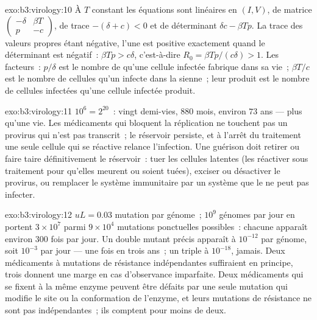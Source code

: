 \begin{solution}{exo:b3:virology:10}
À $T$ constant les équations sont linéaires en $(I, V)$, de matrice
$\begin{pmatrix} -\delta & \beta T \\ p & -c \end{pmatrix}$, de trace
$-(\delta + c) < 0$ et de déterminant $\delta c - \beta Tp$. La trace
des valeurs propres étant négative, l'une est positive exactement quand
le déterminant est négatif~: $\beta Tp > c\delta$, c'est-à-dire
$R_{0} = \beta
Tp/(c\delta) > 1$. Les facteurs~: $p/\delta$ est le nombre de 
qu'une cellule infectée fabrique dans sa vie~; $\beta T/c$ est le
nombre de cellules qu'un  infecte dans la sienne~; leur produit
est le nombre de cellules infectées qu'une cellule infectée produit.
\end{solution}

\begin{solution}{exo:b3:virology:11}
$10^{6} = 2^{20}$~: vingt demi-vies, $880$ mois, environ $73$ ans ---
plus qu'une vie. Les médicaments qui bloquent la réplication ne
touchent pas un provirus qui n'est pas transcrit~; le réservoir
persiste, et à l'arrêt du traitement une seule cellule qui se réactive
relance l'infection. Une guérison doit retirer ou faire taire
définitivement le réservoir~: tuer les cellules latentes (les réactiver
sous traitement pour qu'elles meurent ou soient tuées), exciser ou
désactiver le provirus, ou remplacer le système immunitaire par un
système que le  ne peut pas infecter.
\end{solution}

\begin{solution}{exo:b3:virology:12}
$uL = 0.03$ mutation par génome~; $10^{9}$ génomes par jour en portent
$3\times
10^{7}$ parmi $9\times 10^{4}$ mutations ponctuelles possibles~: chacune
apparaît environ $300$ fois par jour. Un double mutant précis apparaît
à $10^{-12}$ par génome, soit $10^{-3}$ par jour --- une fois en trois
ans~; un triple à $10^{-18}$, jamais. Deux médicaments à mutations de
résistance indépendantes suffiraient en principe, trois donnent une
marge en cas d'observance imparfaite. Deux médicaments qui se fixent à
la même enzyme peuvent être défaits par une seule mutation qui modifie
le site ou la conformation de l'enzyme, et leurs mutations de
résistance ne sont pas indépendantes~; ils comptent pour moins de deux.
\end{solution}

